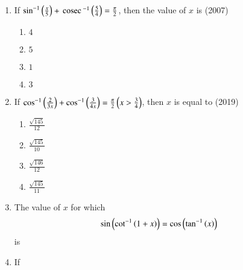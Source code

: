 \begin{enumerate}[label=\thesubsection.\arabic*,ref=\thesubsection.\theenumi]
\hfill {}
\begin{enumerate}
\end{enumerate}
	\item{
			If $\sin^{-1} \left(\frac{x}{5}\right) + \,\text{cosec}\,^{-1}\left(\frac{5}{4}\right) = \frac{\pi}{2}$, then the value of $x$ is \hfill (2007)
		\begin{multicols}{4}
		\begin{enumerate}
			\item{$4$}
			\item{$5$}
			\item{$1$}
			\item{$3$}
		\end{enumerate}
		\end{multicols}
	}
	\item{
			If $\cos^{-1}\left(\frac{2}{3x}\right) + \cos^{-1}\left(\frac{3}{4x}\right) = \frac{\pi}{2} \left(x > \frac{3}{4}\right)$, then $x$ is equal to \hfill (2019)
		\begin{multicols}{4}
		\begin{enumerate}
			\item{$\frac{\sqrt{145}}{12}$}
%			
			\item{$\frac{\sqrt{145}}{10}$}
%			
			\item{$\frac{\sqrt{146}}{12}$}
%			
			\item{$\frac{\sqrt{145}}{11}$}
		\end{enumerate}
		\end{multicols}
	}
\item The value of $x$ for which 
\begin{align*}
\sin\left(\cot^{-1}\left(1+x\right)\right)=\cos \left(\tan ^{-1}\left(x\right)\right)
\end{align*}
is 
\hfill {}
\begin{enumerate}
\end{enumerate}
\item If

\end{enumerate}
